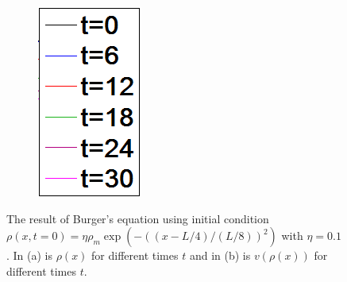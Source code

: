 \begin{figure}[h!]
\begin{subfigure}{.09\textwidth}
	\includegraphics[width=\textwidth]{img/exc3_legend}
\end{subfigure}
\caption{The result of Burger's equation using initial condition $\rho(x, t=0) = \eta \rho_m \exp(-\left((x-L/4)/(L/8)\right)^2)$ with $\eta=0.1$. In (a) is $\rho(x)$ for different times $t$ and in (b) is $v(\rho(x))$ for different times $t$.}
\label{fig:exc3_congestion_eta01}
\end{figure}
\FloatBarrier

